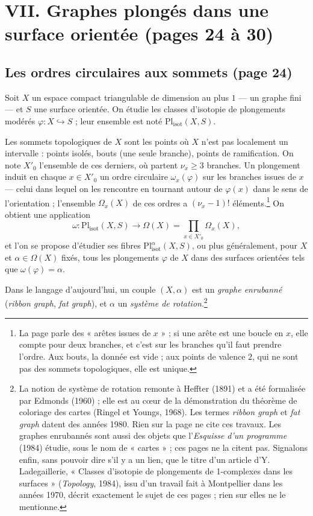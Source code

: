 \documentclass[11pt,a4paper]{article}
\begin{document}
\section*{VII. Graphes plongés dans une surface orientée (pages 24 à 30)}

\subsection*{Les ordres circulaires aux sommets (page 24)}

Soit $X$ un espace compact triangulable de dimension au plus $1$ --- un
graphe fini --- et $S$ une surface orientée. On étudie les classes
d'isotopie de plongements modérés $\varphi : X \hookrightarrow S$ ; leur
ensemble est noté $\mathrm{Pl}_{\mathrm{isot}}(X, S)$.

Les sommets topologiques de $X$ sont les points où $X$ n'est pas localement
un intervalle : points isolés, bouts (une seule branche), points de
ramification. On note $X'_0$ l'ensemble de ces derniers, où partent
$\nu_x \geqslant 3$ branches. Un plongement induit en chaque $x \in X'_0$ un
ordre circulaire $\omega_x(\varphi)$ sur les branches issues de $x$ --- celui
dans lequel on les rencontre en tournant autour de $\varphi(x)$ dans le sens
de l'orientation ; l'ensemble $\Omega_x(X)$ de ces ordres a
$(\nu_x - 1)!$ éléments.\footnote{La page parle des « arêtes issues de
$x$ » ; si une arête est une boucle en $x$, elle compte pour deux branches,
et c'est sur les branches qu'il faut prendre l'ordre. Aux bouts, la donnée
est vide ; aux points de valence $2$, qui ne sont pas des sommets
topologiques, elle est unique.} On obtient une application
\[
\omega : \mathrm{Pl}_{\mathrm{isot}}(X, S) \longrightarrow \Omega(X) = \prod_{x \in X'_0} \Omega_x(X),
\]
et l'on se propose d'étudier ses fibres $\mathrm{Pl}^{\alpha}_{\mathrm{isot}}(X, S)$,
ou plus généralement, pour $X$ et $\alpha \in \Omega(X)$ fixés, tous les
plongements $\varphi$ de $X$ dans des surfaces orientées tels que
$\omega(\varphi) = \alpha$.

Dans le langage d'aujourd'hui, un couple $(X, \alpha)$ est un \emph{graphe
enrubanné} (\emph{ribbon graph}, \emph{fat graph}), et $\alpha$ un
\emph{système de rotation}.\footnote{La notion de système de rotation remonte
à Heffter (1891) et a été formalisée par Edmonds (1960) ; elle est au cœur
de la démonstration du théorème de coloriage des cartes (Ringel et Youngs,
1968). Les termes \emph{ribbon graph} et \emph{fat graph} datent
des années 1980. Rien sur la page ne cite ces travaux. Les graphes
enrubannés sont aussi des objets que l'\emph{Esquisse d'un programme} (1984)
étudie, sous le nom de « cartes » ; ces pages ne la citent pas. Signalons enfin, sans pouvoir dire
s'il y a un lien, que le titre d'un article d'Y. Ladegaillerie,
« Classes d'isotopie de plongements de 1-complexes dans les surfaces »
(\emph{Topology}, 1984), issu d'un travail fait à Montpellier dans les années
1970, décrit exactement le sujet de ces pages ; rien sur elles ne le
mentionne.}
\end{document}
